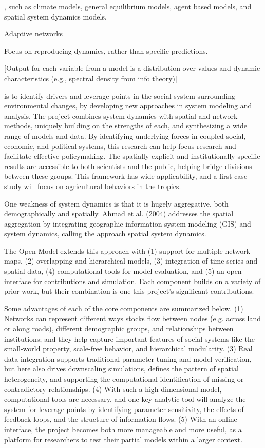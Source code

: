 \documentclass[12pt, oneside]{amsart}
\begin{document}
, such as climate models, general equilibrium models, agent based models, and spatial system dynamics models.  

Adaptive networks

Focus on reproducing dynamics, rather than specific predictions.


[Output for each variable from a model is a distribution over values and dynamic characteristics (e.g., spectral density from info theory)]


 is to identify drivers and leverage points in the social system surrounding environmental changes, by developing new approaches in system modeling and analysis. The project combines system dynamics with spatial and network methods, uniquely building on the strengths of each, and synthesizing a wide range of models and data. By identifying underlying forces in coupled social, economic, and political systems, this research can help focus research and facilitate effective policymaking. The spatially explicit and institutionally specific results are accessible to both scientists and the public, helping bridge divisions between these groups. This framework has wide applicability, and a first case study will focus on agricultural behaviors in the tropics.

One weakness of system dynamics is that it is hugely aggregative, both demographically and spatially. Ahmad et al. (2004) addresses the spatial aggregation by integrating geographic information system modeling (GIS) and system dynamics, calling the approach spatial system dynamics.

The Open Model extends this approach with (1) support for multiple network maps, (2) overlapping and hierarchical models, (3) integration of time series and spatial data, (4) computational tools for model evaluation, and (5) an open interface for contributions and simulation. Each component builds on a variety of prior work, but their combination is one this project’s significant contributions. 


Some advantages of each of the core components are summarized below. (1) Networks can represent different ways stocks flow between nodes (e.g. across land or along roads), different demographic groups, and relationships between institutions; and they help capture important features of social systems like the small-world property, scale-free behavior, and hierarchical modularity. (3) Real data integration supports traditional parameter tuning and model verification, but here also drives downscaling simulations, defines the pattern of spatial heterogeneity, and supporting the computational identification of missing or contradictory relationships. (4) With such a high-dimensional model, computational tools are necessary, and one key analytic tool will analyze the system for leverage points by identifying parameter sensitivity, the effects of feedback loops, and the structure of information flows. (5) With an online interface, the project becomes both more manageable and more useful, as a platform for researchers to test their partial models within a larger context.
\end{document}
